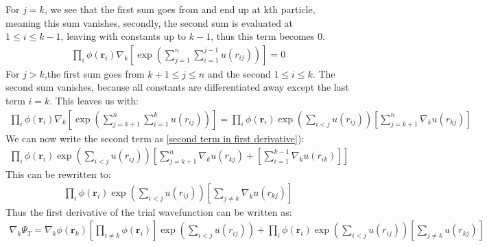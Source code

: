 \documentclass[a4paper, 10pt]{article}
\begin{document}
\begin{appendices}
		For $j = k$, we see that the first sum goes from and end up at kth particle, meaning
		this sum vanishes, secondly, the second sum is evaluated at $1 \le i \le k-1$, leaving with
		constants up to $k-1$, thus this term becomes $0$.
		\begin{align}
		\prod_{i}\phi(\boldsymbol{r}_{i})\nabla_{k}\left[\exp\left(\sum_{j = 1}^{n}\sum_{i = 1}^{j-1}u(r_{ij})\right)\right]
		= 0
		\end{align}
		For $j > k$,the first sum goes from $k+1\le j \le n$ and the second $1 \le i \le k$.  The second sum vanishes, because all constants are differentiated away
		except the last term $i = k$. This leaves us with:
		\begin{align}
		\prod_{i}\phi(\boldsymbol{r}_{i})\nabla_{k}\left[\exp\left(\sum_{j = k+1}^{n}\sum_{i = 1}^{k}u(r_{ij})\right)\right]
		= \prod_{i}\phi(\boldsymbol{r}_{i})
		\exp{\left(\sum_{i<j}u(r_{ij})\right)}
		\left[\sum_{j = k + 1}^{n}\nabla_{k}u(r_{kj})\right]
		\end{align}
		We can now write the second term as \ref{second term in first derivative}):
		\begin{align}\label{combined sum}
		\prod_{i}\phi(\boldsymbol{r}_{i})
		\exp{\left(\sum_{i<j}u(r_{ij})\right)}
		\left[\sum_{j = k + 1}^{n}\nabla_{k}u(r_{kj}) +
		\left[\sum_{i = 1}^{k-1}\nabla_{k}u(r_{ik})\right]\right]
		\end{align}
		This can be rewritten to:
		\begin{align}
		\prod_{i}\phi(\boldsymbol{r}_{i})
		\exp{\left(\sum_{i<j}u(r_{ij})\right)}
		\left[\sum_{j \neq k}\nabla_{k}u(r_{kj})\right]
		\end{align}
		Thus the first derivative of the trial wavefunction
		can be written as:
		\begin{align}
		\nabla_{k}\Psi_{T} =
		\nabla_k \phi(\mathbf{r}_k)\left[ \prod_{i\neq k} \phi(\mathbf{r}_i)\right]\exp\left(\sum_{i<j}u(r_{ij})\right)
		+ \prod_{i}\phi(\boldsymbol{r}_{i})
		\exp{\left(\sum_{i<j}u(r_{ij})\right)}
		\left[\sum_{j \neq k}u(r_{kj})\right]
		\end{align}

\end{appendices}
\end{document}
